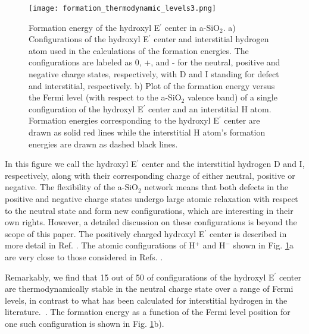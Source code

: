 \documentclass[aps,prb,reprint,superscriptaddress,showpacs]{revtex4-1}
\begin{document}
\begin{figure}[h!]
\texttt{[image: formation\_thermodynamic\_levels3.png]}
\caption{Formation energy of the hydroxyl E$^\prime$ center in a-SiO$_2$. a) Configurations of the hydroxyl E$^\prime$ center and interstitial hydrogen atom used in the calculations of the formation energies.  The configurations are labeled as 0, +, and - for the neutral, positive and negative charge states, respectively, with D and I standing for defect and interstitial, respectively. b) Plot of the formation energy versus the Fermi level (with respect to the a-SiO$_2$ valence band) of a single configuration of the hydroxyl E$^\prime$ center and an interstitial H atom. Formation energies corresponding to the hydroxyl E$^\prime$ center are drawn as solid red lines while the interstitial H atom's formation energies are drawn as dashed black lines. }
\label{fig:hydroxy_thermodynamic}
\end{figure}

In this figure we call the hydroxyl E$^\prime$ center and the interstitial hydrogen D and I, respectively, along with their corresponding charge of either neutral, positive or negative. The flexibility of the a-SiO$_2$ network means that both defects in the positive and negative charge states undergo large atomic relaxation with respect to the neutral state and form new configurations, which are interesting in their own rights. However, a detailed discussion on these configurations is beyond the scope of this paper. The positively charged hydroxyl E$^\prime$ center is described in more detail in Ref. \cite{h_charged_mee}. The atomic configurations of H$^+$ and H$^-$ shown in Fig. \ref{fig:hydroxy_thermodynamic}a are very close to those considered in Refs. \cite{godet_hydrogen,robertson_oxides}.

Remarkably, we find that 15 out of 50 of configurations of the hydroxyl E$^\prime$ center are thermodynamically stable in the neutral charge state over a range of Fermi levels, in contrast to what has been calculated for interstitial hydrogen in the literature.~\cite{godet_hydrogen,robertson_oxides}.  The formation energy as a function of the Fermi level position for one such configuration is shown in Fig. \ref{fig:hydroxy_thermodynamic}b). 
\end{document}
